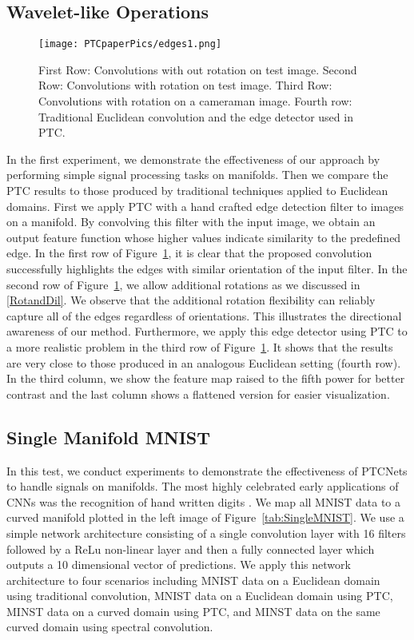 \documentclass[10pt,twocolumn,letterpaper]{article}
\begin{document}
\subsection{Wavelet-like Operations}
\begin{figure}[htp]
\begin{center}
\texttt{[image: PTCpaperPics/edges1.png]}
\end{center}
\caption{First Row: Convolutions with out rotation on test image. Second Row: Convolutions with rotation on test image. Third Row: Convolutions with rotation on a cameraman image. Fourth row: Traditional Euclidean convolution and the edge detector used in PTC.}
\label{fig:wavelet}
\end{figure}
In the first experiment, we demonstrate the effectiveness of our approach by performing simple signal processing tasks on manifolds. Then we  compare the PTC results to those produced by traditional techniques applied to Euclidean domains. First we apply PTC with a hand crafted edge detection filter to images on a manifold. By convolving this filter with the input image, we obtain an output feature function whose higher values indicate similarity to the predefined edge. In the first row of Figure~\ref{fig:wavelet}, it is clear that the proposed convolution successfully highlights the edges with similar orientation of the input filter. In the second row of Figure~\ref{fig:wavelet}, we allow additional rotations as we discussed in \eqref{RotandDil}. We observe that the additional rotation flexibility can reliably capture all of the edges regardless of orientations. This illustrates the directional awareness of our method. Furthermore, we apply this edge detector using PTC to a more realistic problem in the third row of Figure~\ref{fig:wavelet}. It shows that the results are very close to those produced in an analogous Euclidean setting (fourth row). In the third column, we show the feature map raised to the fifth power for better contrast and the last column shows a flattened version for easier visualization.



\subsection{Single Manifold MNIST}
\label{subsec:SingleMfd}
In this test, we conduct experiments to demonstrate the effectiveness of PTCNets to handle signals on manifolds. The most highly celebrated early applications of CNNs was the recognition of hand written digits \cite{lecun1998gradient}. We map all MNIST data to a curved manifold plotted in the left image of Figure~\ref{tab:SingleMNIST}. We use a simple network architecture consisting of a single convolution layer with 16 filters followed by a ReLu non-linear layer and then a fully connected layer which outputs a 10 dimensional vector of predictions. We apply this network architecture to four scenarios including MNIST data on a Euclidean domain using traditional convolution, MNIST data on a Euclidean domain using PTC,  MINST data on a curved domain using PTC, and MINST data on the same curved domain using spectral convolution.
\end{document}
